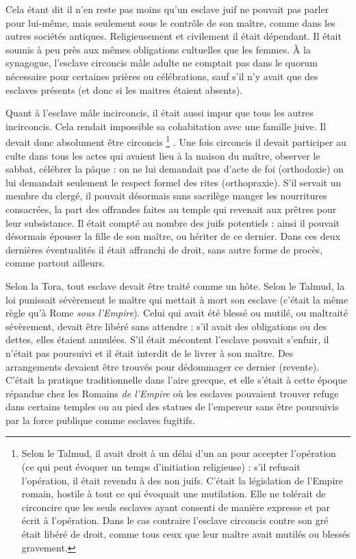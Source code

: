  Cela étant dit il n'en reste pas moins qu'un esclave juif ne pouvait pas parler pour lui-même, mais seulement sous le contrôle de son maître, comme dans les autres sociétés antiques. Religieusement et civilement il était dépendant. Il était soumis à peu près aux mêmes obligations cultuelles que les femmes. À la synagogue, l'esclave circoncis mâle adulte ne comptait pas dans le quorum nécessaire pour certaines prières ou célébrations, sauf s'il n'y avait que des esclaves présents (et donc si les maitres étaient absents).

 Quant à l'esclave mâle incirconcis, il était aussi impur que tous les autres incirconcis. Cela rendait impossible sa cohabitation avec une famille juive. Il devait donc absolument être circoncis%
\footnote{Selon le Talmud, il avait droit à un délai d'un an pour accepter l'opération (ce qui peut évoquer un temps d'initiation religieuse) : s'il refusait l'opération, il était revendu à des non juifs. C'était la législation de l'Empire romain, hostile à tout ce qui évoquait une mutilation. Elle ne tolérait de circoncire que les seuls esclaves ayant consenti de manière expresse et par écrit à l'opération. Dans le cas contraire l'esclave circoncis contre son gré était libéré de droit, comme tous ceux que leur maître avait mutilés ou blessés gravement.}%
. Une fois circoncis il devait participer au culte dans tous les actes qui avaient lieu à la maison du maître, observer le sabbat, célébrer la pâque : on ne lui demandait pas d'acte de foi (orthodoxie) on lui demandait seulement le respect formel des rites (orthopraxie). S'il servait un membre du clergé, il pouvait désormais sans sacrilège manger les nourritures consacrées, la part des offrandes faites au temple qui revenait aux prêtres pour leur subsistance. Il était compté au nombre des juifs potentiels : ainsi il pouvait désormais épouser la fille de son maître, ou hériter de ce dernier. Dans ces deux dernières éventualités il était affranchi de droit, sans autre forme de procès, comme partout ailleurs.

 Selon la Tora, tout esclave devait être traité comme un hôte. Selon le Talmud, la loi punissait sévèrement le maître qui mettait à mort son esclave (c'était la même règle qu'à Rome \emph{sous l'Empire}). Celui qui avait été blessé ou mutilé, ou maltraité sévèrement, devait être libéré sans attendre : s'il avait des obligations ou des dettes, elles étaient annulées. S'il était mécontent l'esclave pouvait s'enfuir, il n'était pas poursuivi et il était interdit de le livrer à son maître. Des arrangements devaient être trouvés pour dédommager ce dernier (revente). C'était la pratique traditionnelle dans l'aire grecque, et elle s'était à cette époque répandue chez les Romains \emph{de l'Empire} où les esclaves pouvaient trouver refuge dans certains temples ou au pied des statues de l'empereur sans être poursuivis par la force publique comme esclaves fugitifs.

